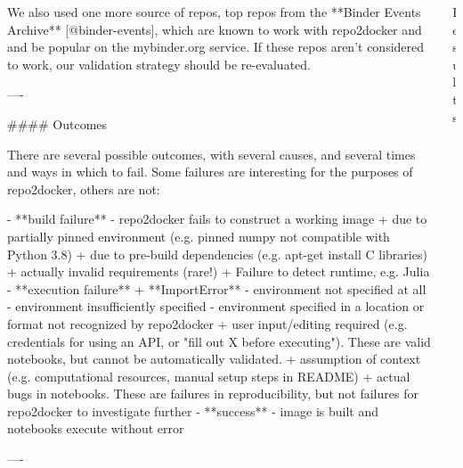 \documentclass{beamer}
\begin{document}
\begin{frame}[fragile]
\begin{columns}[T]
\begin{column}{.3\textwidth}
\begin{markdown}
We also used one more source of repos, top repos from the **Binder Events Archive** [@binder-events],
which are known to work with repo2docker and and be popular on the mybinder.org service.
If these repos aren't considered to work, our validation strategy should be re-evaluated.

----

#### Outcomes

There are several possible outcomes,
with several causes,
and several times and ways in which to fail.
Some failures are interesting for the purposes of repo2docker,
others are not:

- **build failure** - repo2docker fails to construct a working image
    + due to partially pinned environment (e.g. pinned numpy not compatible with Python 3.8)
    + due to pre-build dependencies (e.g. apt-get install C libraries)
    + actually invalid requirements (rare!)
    + Failure to detect runtime, e.g. Julia
- **execution failure**
    + **ImportError**
        - environment not specified at all
        - environment insufficiently specified
        - environment specified in a location or format not recognized by repo2docker
    + user input/editing required (e.g. credentials for using an API, or "fill out X before executing"). These are valid notebooks, but cannot be automatically validated.
    + assumption of context (e.g. computational resources, manual setup steps in README)
    + actual bugs in notebooks. These are failures in reproducibility, but not failures for repo2docker to investigate further
- **success** - image is built and notebooks execute without error

----


\end{markdown}

\end{column}

\begin{column}{.4\textwidth}

\begin{block}{Results}

\center



\end{block}
\end{column}
\end{columns}
\end{frame}
\end{document}
